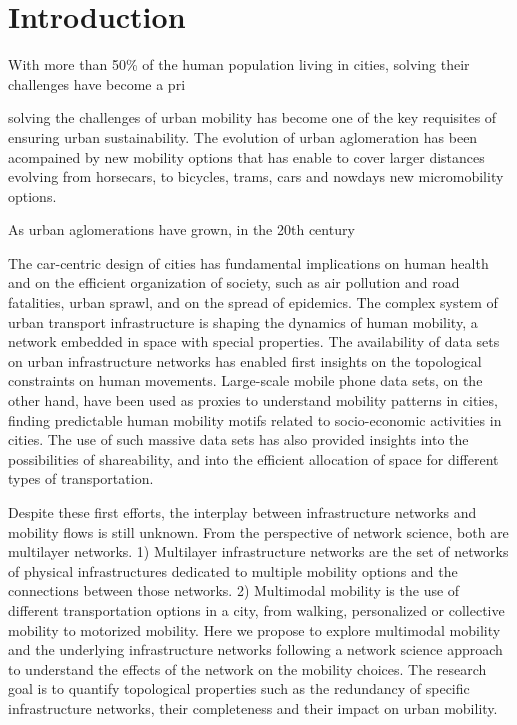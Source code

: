 \chapter{Introduction}
With more than 50\% of the human population living in cities, solving their challenges have become a pri

solving the challenges of urban mobility has become one of the key requisites of ensuring urban sustainability. The evolution of urban aglomeration has been acompained by new mobility options that has enable to cover larger distances evolving from horsecars, to bicycles, trams, cars and nowdays new micromobility options. 

As urban aglomerations have grown, in the 20th century 


The car-centric design of cities has fundamental implications on human health and on the efficient organization of society, such as air pollution and road fatalities, urban sprawl, and on the spread of epidemics. The complex system of urban transport infrastructure is shaping the dynamics of human mobility, a network embedded in space with special properties. The availability of data sets on urban infrastructure networks has enabled first insights on the topological constraints on human movements. Large-scale mobile phone data sets, on the other hand, have been used as proxies to understand mobility patterns in cities, finding predictable human mobility motifs related to socio-economic activities in cities. The use of such massive data sets has also provided insights into the possibilities of shareability, and into the efficient allocation of space for different types of transportation.

Despite these first efforts, the interplay between infrastructure networks and mobility flows is still unknown. From the perspective of network science, both are multilayer networks. 1) Multilayer infrastructure networks are the set of networks of physical infrastructures dedicated to multiple mobility options and the connections between those networks. 2) Multimodal mobility is the use of different transportation options in a city, from walking, personalized or collective mobility to motorized mobility.
Here we propose to explore multimodal mobility and the underlying infrastructure networks following a network science approach to understand the effects of the network on the mobility choices. The research goal is to quantify topological properties such as the redundancy of specific infrastructure networks, their completeness and their impact on urban mobility. 

